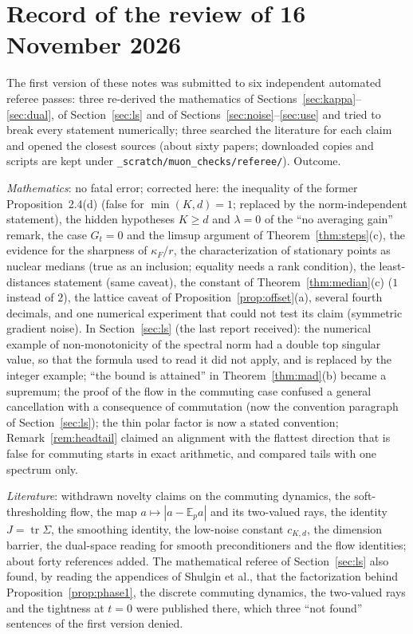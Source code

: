\documentclass[11pt]{article}
\theoremstyle{definition}
\theoremstyle{remark}
\newcommand{\E}{\mathbb{E}}
\newcommand{\abs}[1]{\left|#1\right|}
\newcommand{\tr}{\operatorname{tr}}
\newcommand{\kF}{\kappa_{F}}
\begin{document}
\section{Record of the review of 16 November 2026}\label{app:review}
The first version of these notes was submitted to six independent automated referee passes: three re-derived the
mathematics of Sections~\ref{sec:kappa}--\ref{sec:dual}, of Section~\ref{sec:ls} and of
Sections~\ref{sec:noise}--\ref{sec:use} and tried to break every statement numerically; three searched the literature
for each claim and opened the closest sources (about sixty papers; downloaded copies and scripts are kept under
\texttt{\_scratch/muon\_checks/referee/}). Outcome.

\emph{Mathematics}: no fatal error; corrected here: the inequality
of the former Proposition~2.4(d) (false for $\min(K,d)=1$; replaced by the norm-independent statement), the hidden
hypotheses $K\ge d$ and $\lambda=0$ of the ``no averaging gain'' remark, the case $G_t=0$ and the limsup argument of
Theorem~\ref{thm:steps}(c), the evidence for the sharpness of $\kF/r$, the characterization of stationary points as
nuclear medians (true as an inclusion; equality needs a rank condition), the least-distances statement (same caveat),
the constant of Theorem~\ref{thm:median}(c) ($1$ instead of $2$), the lattice caveat of Proposition~\ref{prop:offset}(a),
several fourth decimals, and one numerical experiment that could not test its claim (symmetric gradient noise). In
Section~\ref{sec:ls} (the last report received): the numerical example of non-monotonicity of the spectral norm had a
double top singular value, so that the formula used to read it did not apply, and is replaced by the integer example;
``the bound is attained'' in Theorem~\ref{thm:mad}(b) became a supremum; the proof of the flow in the commuting case
confused a general cancellation with a consequence of commutation (now the convention paragraph of
Section~\ref{sec:ls}); the thin polar factor is now a stated convention; Remark~\ref{rem:headtail} claimed an alignment
with the flattest direction that is false for commuting starts in exact arithmetic, and compared tails with one
spectrum only.

\emph{Literature}: withdrawn novelty claims on the commuting dynamics, the soft-thresholding flow, the map
$a\mapsto\abs{a-\E_pa}$ and its two-valued rays, the identity $J=\tr\Sigma$, the smoothing identity, the low-noise
constant $c_{K,d}$, the dimension barrier, the dual-space reading for smooth preconditioners and the flow identities;
about forty references added. The mathematical referee of Section~\ref{sec:ls} also found, by reading the appendices of
Shulgin et al., that the factorization behind Proposition~\ref{prop:phase1}, the discrete commuting dynamics, the
two-valued rays and the tightness at $t=0$ were published there, which three ``not found'' sentences of the first
version denied.
\end{document}
